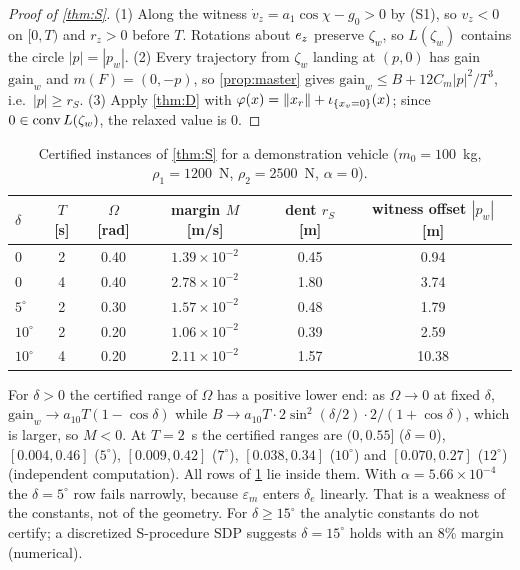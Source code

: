 \begin{proof}[Proof of \cref{thm:S}]
(1) Along the witness $\dot v_z=a_1\cos\chi-g_0>0$ by (S1), so $v_z<0$ on $[0,T)$ and $r_z>0$ before $T$. Rotations about $e_z$ preserve
$\zeta_w$, so $L(\zeta_w)$ contains the circle $|p|=|p_w|$. (2) Every trajectory from $\zeta_w$ landing at $(p,0)$ has gain $\mathrm{gain}_w$
and $m(F)=(0,-p)$, so \cref{prop:master} gives $\mathrm{gain}_w\le B+12C_m|p|^2/T^3$, i.e.\ $|p|\ge r_S$. (3) Apply \cref{thm:D} with
$\varphi(x)=\lVert x_r\rVert+\iota_{\{x_v=0\}}(x)$; since $0\in\operatorname{conv} L(\zeta_w)$, the relaxed value is $0$.
\end{proof}

\begin{table}[h]\centering\small
\caption{Certified instances of \cref{thm:S} for a demonstration vehicle ($m_0=100$~kg, $\rho_1=1200$~N, $\rho_2=2500$~N, $\alpha=0$).}\label{tab:S}
\begin{tabular}{@{}lccccc@{}}\toprule
$\delta$ & $T$ [s] & $\Omega$ [rad] & margin $M$ [m/s] & dent $r_S$ [m] & witness offset $|p_w|$ [m]\\\midrule
$0$ & 2 & 0.40 & $1.39\times10^{-2}$ & 0.45 & 0.94\\
$0$ & 4 & 0.40 & $2.78\times10^{-2}$ & 1.80 & 3.74\\
$5^\circ$ & 2 & 0.30 & $1.57\times10^{-2}$ & 0.48 & 1.79\\
$10^\circ$ & 2 & 0.20 & $1.06\times10^{-2}$ & 0.39 & 2.59\\
$10^\circ$ & 4 & 0.20 & $2.11\times10^{-2}$ & 1.57 & 10.38\\\bottomrule
\end{tabular}
\end{table}
For $\delta>0$ the certified range of $\Omega$ has a positive lower end: as $\Omega\to0$ at fixed $\delta$, $\mathrm{gain}_w\to a_{10}T(1-\cos\delta)$
while $B\to a_{10}T\cdot2\sin^2(\delta/2)\cdot2/(1+\cos\delta)$, which is larger, so $M<0$. At $T=2$~s the certified ranges are $(0,0.55]$
($\delta=0$), $[0.004,0.46]$ ($5^\circ$), $[0.009,0.42]$ ($7^\circ$), $[0.038,0.34]$ ($10^\circ$) and $[0.070,0.27]$ ($12^\circ$) (independent 
computation). All rows of \cref{tab:S} lie inside them.
With $\alpha=5.66\times10^{-4}$ the $\delta=5^\circ$ row fails narrowly, because $\varepsilon_m$ enters $\delta_e$ linearly. That is a weakness of the constants,
not of the geometry. For $\delta\ge15^\circ$ the analytic constants do not certify; a discretized S-procedure SDP suggests $\delta=15^\circ$
holds with an 8\% margin (numerical).
